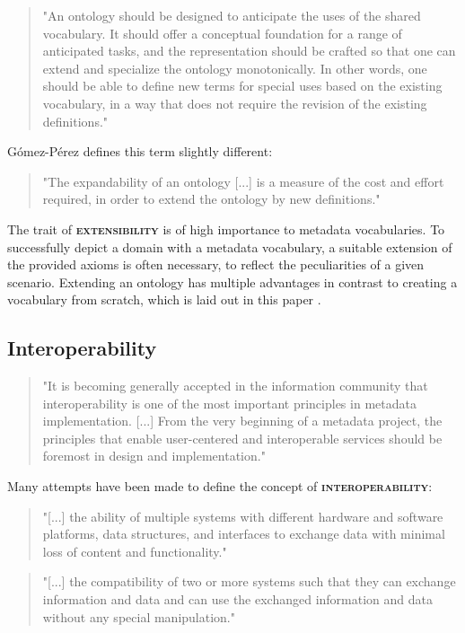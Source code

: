 \documentclass[a4paper,english,twoside,BCOR1.5cm,headsepline,DIV12,appendixprefix,final,12pt]{scrbook}
\newcommand{\extensibility}{{\ttfamily\scshape\bfseries extensibility}\xspace}
\newcommand{\interoperability}{{\ttfamily\scshape\bfseries interoperability}\xspace}
\begin{document}
\begin{quote}
"An ontology should be designed to anticipate the uses of the shared
vocabulary. It should offer a conceptual foundation for a range of anticipated tasks,
and the representation should be crafted so that one can extend and specialize the
ontology monotonically. In other words, one should be able to define new terms for
special uses based on the existing vocabulary, in a way that does not require the
revision of the existing definitions." \cite{Gruber}
\end{quote}

G{\'{o}}mez{-}P{\'{e}}rez defines this term slightly different:
\begin{quote}
"The expandability of an ontology [...] is a measure of the cost and effort required, in order to extend the ontology by new definitions." \cite{GomezPerez}
\end{quote}

The trait of \extensibility is of high importance to metadata vocabularies. To successfully depict a domain with a metadata vocabulary, a suitable extension of the provided axioms is often necessary, to reflect the peculiarities of a given scenario.
Extending an ontology has multiple advantages in contrast to creating a vocabulary from scratch, which is laid out in this paper \cite{Keet}.

\subsection{Interoperability}
\label{sec:interoperability}
\begin{quote}
"It is becoming generally accepted in the information community that interoperability is one of the most important principles in metadata implementation. [...] From the very beginning of a metadata project, the principles that enable user-centered and interoperable services should be foremost in design and implementation." \cite{3dchinauslibraryconference}
\end{quote}
Many attempts have been made to define the concept of \interoperability:
\begin{quote}
"[...] the ability of
multiple systems with different
hardware and software platforms,
data structures, and interfaces to
exchange data with minimal loss of
content and functionality." \cite{NISO2004}
\end{quote}

\begin{quote}
"[...] the compatibility of two or more systems such that they can exchange information and data and can use the exchanged information and data without any special manipulation." \cite{taylor}
\end{quote}
\end{document}
